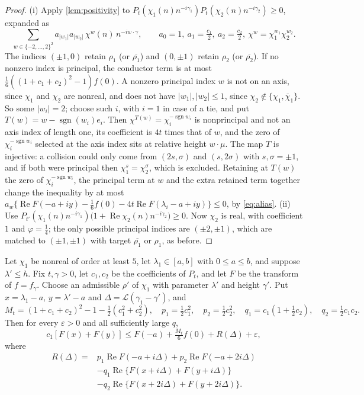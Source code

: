 \documentclass[11pt]{amsart}
\numberwithin{equation}{section}
\theoremstyle{plain}
\theoremstyle{definition}
\theoremstyle{remark}
\newcommand{\LL}{\mathcal{L}}
\renewcommand{\Re}{\operatorname{Re}}
\newcommand{\eps}{\varepsilon}
\newcommand{\1}{\mathbf{1}}
\newcommand{\bchi}{\overline{\chi}}
\begin{document}
\begin{proof}
(i) Apply \cref{lem:positivity} to $P_t(\chi_1(n)n^{-i\gamma_1})P_t(\chi_2(n)n^{-i\gamma_2})\ge0$, expanded as
\[
  \sum_{w\in\{-2,\dots,2\}^2}a_{|w_1|}a_{|w_2|}\,\chi^w(n)\,n^{-iw\cdot\gamma},\qquad
  a_0=1,\ a_1=\tfrac{c_1}2,\ a_2=\tfrac{c_2}2,\ \chi^w=\chi_1^{w_1}\chi_2^{w_2}.
\] The indices $(\pm1,0)$ retain $\rho_1$ (or $\overline{\rho_1}$) and $(0,\pm1)$ retain $\rho_2$
(or $\overline{\rho_2}$). If no nonzero index is principal, the conductor term is at most
$\frac16((1+c_1+c_2)^2-1)f(0)$. A nonzero principal index $w$ is not on an axis, since $\chi_1$ and $\chi_2$
are nonreal, and does not have $|w_1|,|w_2|\le1$, since $\chi_2\notin\{\chi_1,\bchi_1\}$. So some $|w_i|=2$;
choose such $i$, with $i=1$ in case of a tie, and put $T(w)=w-\operatorname{sgn}(w_i)e_i$. Then
$\chi^{T(w)}=\chi_i^{-\operatorname{sgn}w_i}$ is nonprincipal and not an axis index of length one, its
coefficient is $4t$ times that of $w$, and the zero of $\chi_i^{-\operatorname{sgn}w_i}$ selected at the axis
index sits at relative height $w\cdot\mu$. The map $T$ is injective: a collision could only come from
$(2s,\sigma)$ and $(s,2\sigma)$ with $s,\sigma=\pm1$, and if both were principal then $\chi_1^s=\chi_2^\sigma$,
which is excluded. Retaining at $T(w)$ the zero of $\chi_i^{-\operatorname{sgn}w_i}$, the principal term at $w$
and the extra retained term together change the inequality by at most
$a_w\{\Re F(-a+iy)-\frac16f(0)-4t\Re F(\lambda_i-a+iy)\}\le0$, by \eqref{eq:alias}. (ii) Use
$P_{t'}(\chi_1(n)n^{-i\gamma_1})\bigl(1+\Re\chi_2(n)n^{-i\gamma_2}\bigr)\ge0$. Now $\chi_2$ is real, with coefficient
$1$ and $\varphi=\frac14$; the only possible principal indices are $(\pm2,\pm1)$, which are matched to
$(\pm1,\pm1)$ with target $\overline{\rho_1}$ or $\rho_1$, as before.
\end{proof}

\begin{proposition}\label{prop:polyrows}
Let $\chi_1$ be nonreal of order at least $5$, let $\lambda_1\in[a,b]$ with $0\le a\le b$, and suppose
$\lambda'\le h$. Fix $t,\gamma>0$, let $c_1,c_2$ be the coefficients of $P_t$, and let
$F$ be the transform of $f=f_\gamma$. Choose an admissible $\rho'$ of $\chi_1$ with
parameter $\lambda'$ and height $\gamma'$. Put
$x=\lambda_1-a$, $y=\lambda'-a$ and $\Delta=\LL(\gamma_1-\gamma')$, and
\[
  M_t=(1+c_1+c_2)^2-1-\tfrac12(c_1^2+c_2^2),\quad p_1=\tfrac12c_1^2,\quad p_2=\tfrac12c_2^2,\quad
  q_1=c_1(1+\tfrac12c_2),\quad q_2=\tfrac12c_1c_2 .
\]
Then for every $\eps>0$ and all sufficiently large $q$,
\[
  c_1[F(x)+F(y)]\le F(-a)+\tfrac{M_t}6f(0)+R(\Delta)+\eps,
\]
where
\begin{align*}
 R(\Delta)={}&p_1\Re F(-a+i\Delta)+p_2\Re F(-a+2i\Delta)\\
 &-q_1\Re\{F(x+i\Delta)+F(y+i\Delta)\}\\
 &-q_2\Re\{F(x+2i\Delta)+F(y+2i\Delta)\}.
\end{align*}
\end{proposition}
\end{document}
